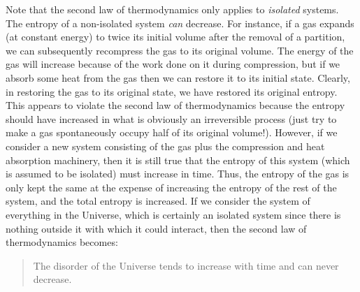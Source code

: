 Note that the second law of thermodynamics only applies to {\em isolated}
 systems. The
entropy of a non-isolated system {\em can}\/ decrease. For instance, if a gas expands 
(at constant energy) to twice its initial  volume 
after the removal of a partition, we can subsequently recompress
the gas to its original volume. The energy of the gas will increase because of the
work done on it during compression, but if we absorb some heat from the gas then we 
can restore it to its initial state. Clearly, in restoring the gas to its original
state, we have restored its original  entropy. 
This appears to violate the second law of thermodynamics because the entropy
should have increased in what is obviously an irreversible process (just try
to make a gas spontaneously occupy  half of its original volume!). However,
 if we consider a new system consisting
of the gas plus the compression  and heat absorption machinery, then it is still
true that the entropy of this system (which is assumed to be isolated)
must increase in time. Thus, the entropy of the gas is only kept the same  at the
expense of increasing the entropy of the rest of the system, and the total
entropy is increased. If we consider the system of everything in the Universe, which
is certainly an isolated system since there is nothing outside it with which it could
interact, then the second law of thermodynamics becomes:
\begin{quote}
{\sf The disorder of the Universe tends to increase with time and can never decrease.}
\end{quote}

